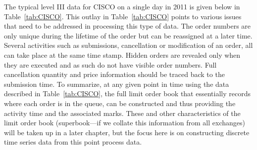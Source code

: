 The typical level III data for CISCO on a single day in 2011 is given below in Table~\ref{tab:CISCO}. This outlay in Table~\ref{tab:CISCO} points to various issues that need to be addressed in processing this type of data. The order numbers are only unique during the lifetime of the order but can be reassigned at a later time. Several activities such as submissions, cancellation or modification of an order, all can take place at the same time stamp. Hidden orders are revealed only when they are executed and as such do not have visible order numbers. Full cancellation quantity and price information should be traced back to the submission time. To summarize, at any given point in time using the data described in Table~\ref{tab:CISCO}, the full limit order book that essentially records where each order is in the queue, can be constructed and thus providing the activity time and the associated marks. These and other characteristics of the limit order book (superbook---if we collate this information from all exchanges) will be taken up in a later chapter, but the focus here is on constructing discrete time series data from this point process data. 
